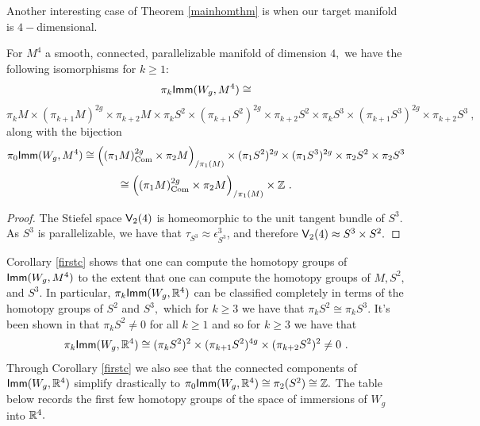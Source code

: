 Another interesting case of Theorem \ref{mainhomthm} is when our target manifold is $4-$dimensional.
\begin{cor} \label{firstc}
For $M^{4}$ a smooth, connected, parallelizable manifold of dimension $4,$ we have the following isomorphisms for $k \geq 1:$
\[
\pi_{k}{\sf Imm}(W_{g}, M^{4}) \cong 
\]
\[
\pi_{k}M \times (\pi_{k + 1}M)^{2g} \times \pi_{k + 2}M \times 
\pi_{k}S^{2} \times (\pi_{k + 1}S^{2})^{2g} \times \pi_{k + 2}S^{2} \times 
\pi_{k}S^{3} \times (\pi_{k + 1}S^{3})^{2g} \times \pi_{k + 2}S^{3}~,
\]
along with the bijection
\[
\pi_{0}{\sf Imm}(W_{g}, M^{4}) \cong  \Bigl((\pi_{1}M)_{\rm Com}^{2g} \times \pi_{2}M \Bigr)_{/\pi_1(M)} 
\times (\pi_{1}S^{2})^{2g} \times (\pi_{1}S^{3})^{2g} \times \pi_{2}S^{2} \times \pi_{2}S^{3}
\]
\[
\cong \Bigl((\pi_{1}M)_{\rm Com}^{2g} \times \pi_{2}M \Bigr)_{/\pi_1(M)} 
\times \mathbb Z ~.
\]
\end{cor}
\begin{proof}
The Stiefel space $\mathsf V_{2}(4)$ is homeomorphic to the unit tangent bundle of $S^{3}.$ As $S^{3}$ is parallelizable, we have that $\tau_{S^{3}} \approx \epsilon_{S^{3}}^{3}$, and therefore $\mathsf V_{2}(4) \approx S^{3} \times S^{2}.$ 
\end{proof}
Corollary \ref{firstc} shows that one can compute the homotopy groups of ${\sf Imm}(W_{g}, M^{4})$ to the extent that one can compute the homotopy groups of $M, S^{2},$ and $S^{3}.$ In particular, $\pi_{k}{\sf Imm}(W_{g}, \mathbb R^{4})$ can be classified completely in terms of the homotopy groups of $S^{2}$ and $S^{3},$ which for $k \geq 3$ we have that $\pi_{k}S^{2} \cong \pi_{k}S^{3}.$ It's been shown in \cite{IMW} that $\pi_{k}S^{2} \neq 0$ for all $k \geq 1$  and so for $k \geq 3$ we have that 
\[
\pi_{k}{\sf Imm}(W_{g}, \mathbb R^{4}) \cong (\pi_{k}S^{2})^{2} \times (\pi_{k + 1}S^{2})^{4g} \times (\pi_{k + 2}S^{2})^{2} \neq 0~.
\]
Through Corollary \ref{firstc} we also see that the connected components of ${\sf Imm}(W_{g}, \mathbb R^{4})$ simplify drastically to $\pi_{0}{\sf Imm}(W_{g}, \mathbb R^{4}) \cong \pi_{2}(S^{2}) \cong \mathbb Z.$
The table below records the first few homotopy groups of the space of immersions of $W_{g}$ into $\mathbb R^{4}.$ 

